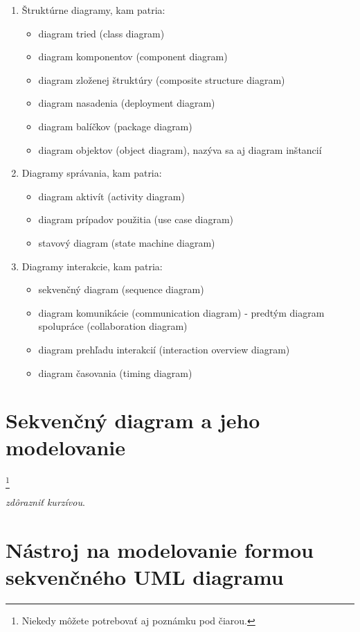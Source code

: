 \documentclass[10pt,twoside,slovak,a4paper]{article}
\begin{document}
\begin{enumerate}
\item Štruktúrne diagramy, kam patria:
	\begin{itemize}
	\item diagram tried (class diagram)
	\item diagram komponentov (component diagram)
	\item diagram zloženej štruktúry (composite structure diagram)
	\item diagram nasadenia (deployment diagram)
	\item diagram balíčkov (package diagram)
	\item diagram objektov (object diagram), nazýva sa aj diagram inštancií
	\end{itemize}
\item Diagramy správania, kam patria:
	\begin{itemize}
	\item diagram aktivít (activity diagram)
	\item diagram prípadov použitia (use case diagram)
	\item stavový diagram (state machine diagram)
	\end{itemize}
\item Diagramy interakcie, kam patria:
	\begin{itemize}
	\item sekvenčný diagram (sequence diagram)
	\item diagram komunikácie (communication diagram) - predtým diagram spolupráce (collaboration diagram)
	\item diagram prehľadu interakcií (interaction overview diagram)
	\item diagram časovania (timing diagram)
	\end{itemize}
\end{enumerate}



\section{Sekvenčný diagram a jeho modelovanie} \label{Sekvenčný}

\footnote{Niekedy môžete potrebovať aj poznámku pod čiarou.}

\emph{zdôrazniť kurzívou}.


\section{Nástroj na modelovanie formou sekvenčného UML diagramu} \label{Nástroj}
\end{document}
